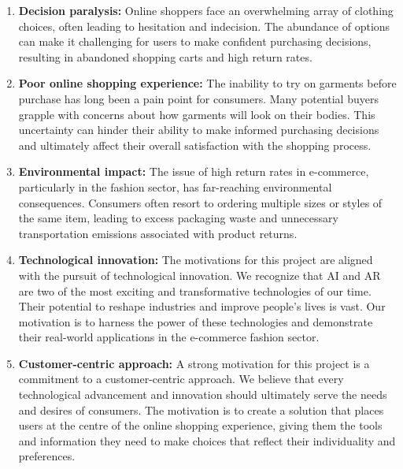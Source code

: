 	\begin{enumerate}
		\item \textbf{Decision paralysis:} Online shoppers face an overwhelming array of clothing choices, often leading to hesitation and indecision. The abundance of options can make it challenging for users to make confident purchasing decisions, resulting in abandoned shopping carts and high return rates.
		\item \textbf{Poor online shopping experience:} The inability to try on garments before purchase has long been a pain point for consumers. Many potential buyers grapple with concerns about how garments will look on their bodies. This uncertainty can hinder their ability to make informed purchasing decisions and ultimately affect their overall satisfaction with the shopping process.
		\item \textbf{Environmental impact:} The issue of high return rates in e-commerce, particularly in the fashion sector, has far-reaching environmental consequences. Consumers often resort to ordering multiple sizes or styles of the same item, leading to excess packaging waste and unnecessary transportation emissions associated with product returns.
		\item \textbf{Technological innovation:} The motivations for this project are aligned with the pursuit of technological innovation. We recognize that AI and AR are two of the most exciting and transformative technologies of our time. Their potential to reshape industries and improve people's lives is vast. Our motivation is to harness the power of these technologies and demonstrate their real-world applications in the e-commerce fashion sector.
		\item \textbf{Customer-centric approach:} A strong motivation for this project is a commitment to a customer-centric approach. We believe that every technological advancement and innovation should ultimately serve the needs and desires of consumers. The motivation is to create a solution that places users at the centre of the online shopping experience, giving them the tools and information they need to make choices that reflect their individuality and preferences.
	\end{enumerate}